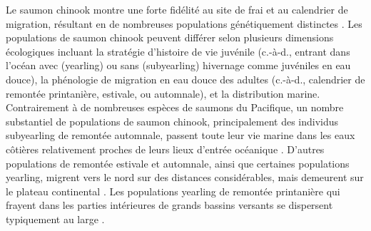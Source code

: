 Le saumon chinook montre une forte fidélité au site de frai et au calendrier de migration, résultant en de nombreuses populations génétiquement distinctes \citep{healeyLifeHistoryChinook1991, quinnBehaviourEcologyPacific2018}. Les populations de saumon chinook peuvent différer selon plusieurs dimensions écologiques incluant la stratégie d'histoire de vie juvénile (c.-à-d., entrant dans l'océan avec (yearling) ou sans (subyearling) hivernage comme juvéniles en eau douce), la phénologie de migration en eau douce des adultes (c.-à-d., calendrier de remontée printanière, estivale, ou automnale), et la distribution marine. Contrairement à de nombreuses espèces de saumons du Pacifique, un nombre substantiel de populations de saumon chinook, principalement des individus subyearling de remontée automnale, passent toute leur vie marine dans les eaux côtières relativement proches de leurs lieux d'entrée océanique \citep{oneillMarineDistributionLife2009, chamberlinEffectsNatalOrigin2014, freshwaterIntegratedModelSeasonal2021}. D'autres populations de remontée estivale et automnale, ainsi que certaines populations yearling, migrent vers le nord sur des distances considérables, mais demeurent sur le plateau continental \citep{weitkampMarineDistributionsChinook2010, ctc2021AnnualReport2022}. Les populations yearling de remontée printanière qui frayent dans les parties intérieures de grands bassins versants se dispersent typiquement au large \citep{weitkampMarineDistributionsChinook2010, ctc2021AnnualReport2022}.

